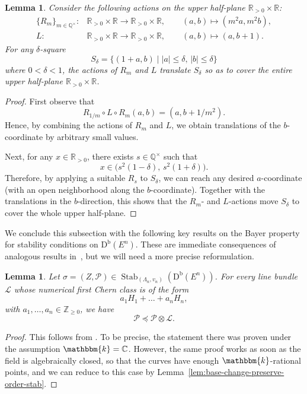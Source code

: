 \documentclass[11pt, reqno]{amsart}
\numberwithin{equation}{section}
\theoremstyle{plain}
\newtheorem{lemma}[theorem]{Lemma}
\theoremstyle{remark}
\theoremstyle{definition}
\theoremstyle{italicsname}
\newcommand{\Db}{\mathrm{D^b}}
\DeclareMathOperator{\Stab}{Stab}
\newcommand{\cL}{\mathcal{L}}
\newcommand{\cP}{\mathscr{P}}
\newcommand{\KK}{\mathbbm{k}}
\def\CC{\ensuremath{\mathbb{C}}}
\def\QQ{\ensuremath{\mathbb{Q}}}
\def\RR{\ensuremath{\mathbb{R}}}
\def\ZZ{\ensuremath{\mathbb{Z}}}
\begin{document}
\begin{lemma}\label{lem:deltasquare}
Consider the following actions on the upper half-plane
$\RR_{>0}\times \RR$:
\begin{align*}
   \{R_m\}_{m\in\QQ^\times}\colon & \RR_{>0}\times \RR \longrightarrow \RR_{>0}\times \RR,
   \qquad (a,b)\longmapsto (m^2 a, m^2 b),\\
   L\colon & \RR_{>0}\times \RR \longrightarrow \RR_{>0}\times \RR,
   \qquad (a,b)\longmapsto (a, b+1).
\end{align*}
For any $\delta$-square
\[
S_\delta=\{(1+a,b)\mid |a|\le \delta,\, |b|\le \delta\} 
\]
where $0<\delta <1$, 
the actions of $R_m$ and $L$ translate $S_\delta$ so as to cover the entire
upper half-plane $\RR_{>0}\times \RR$.
\end{lemma}

\begin{proof}
First observe that
\[
R_{1/m}\circ L \circ R_m (a,b)
= (a, b+1/m^2).
\]
Hence, by combining the actions of $R_m$ and $L$, we obtain translations of the $b$-coordinate by arbitrary small values.

Next, for any $x\in \RR_{>0}$, there exists $s\in \QQ^\times$ such that
\[
x \in \bigl(s^2(1-\delta),\, s^2(1+\delta)\bigr).
\]
Therefore, by applying a suitable $R_s$ to $S_\delta$, we can reach any
desired $a$-coordinate (with an open neighborhood along the $b$-coordinate). Together with the translations in the $b$-direction, this shows that the $R_m$- and $L$-actions move $S_\delta$ to cover the whole upper half-plane.
\end{proof}

We conclude this subsection with the following key results on the Bayer property for stability conditions on $\Db(E^n)$.
These are immediate consequences of analogous results in~\cite{chunyi-stability}, but we will need a more precise reformulation.

\begin{lemma}\label{lem:BayerPropertyEllipticCurves1}
Let $\sigma=(Z,\cP)\in\Stab_{(\Lambda_n,v_n)}(\Db(E^n))$.
For every line bundle $\cL$ whose numerical first Chern class is of the form
\[
a_1 H_1 + \dots + a_nH_n,
\]
with $a_1,\dots,a_n\in\ZZ_{\geq0}$, we have
\begin{equation*}\label{eq:BayerPropertyEllipticCurves1}
    \cP\preceq\cP\otimes\cL.
\end{equation*}
\end{lemma}

\begin{proof}
This follows from \cite[Lemma 2.3]{chunyi-stability}. 
To be precise, the statement there was proven under the assumption $\KK=\CC$. 
However, the same proof works as soon as the field is algebraically closed, so that the curves have enough $\KK$-rational points, and 
we can reduce to this case by Lemma~\ref{lem:base-change-preserve-order-stab}.
\end{proof}
\end{document}
